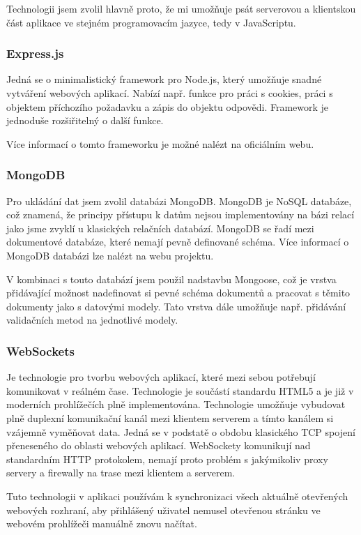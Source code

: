 \documentclass[ing,male,java,dept460]{diploma}						%
\begin{document}
Technologii jsem zvolil hlavně proto, že mi umožňuje psát serverovou a klientskou část aplikace ve stejném programovacím jazyce, tedy v JavaScriptu.

\subsubsection{Express.js}
\label{sec:ExpressJs}
Jedná se o minimalistický framework pro Node.js, který umožňuje snadné vytváření webových aplikací. Nabízí např. funkce pro práci s cookies, práci s objektem příchozího požadavku a zápis do objektu odpovědi. Framework je jednoduše rozšiřitelný o další funkce.

Více informací o tomto frameworku je možné nalézt na oficiálním webu\cite{expressjs}.

\subsubsection{MongoDB}
Pro ukládání dat jsem zvolil databázi MongoDB. MongoDB je NoSQL databáze, což znamená, že principy přístupu k datům nejsou implementovány na bázi relací jako jsme zvyklí u klasických relačních databází. MongoDB se řadí mezi dokumentové databáze, které nemají pevně definované schéma. Více informací o MongoDB databázi lze nalézt na webu projektu\cite{mongodb}.

V kombinaci s touto databází jsem použil nadstavbu Mongoose\cite{mongoose}, což je vrstva přidávající možnost nadefinovat si pevné schéma dokumentů a pracovat s těmito dokumenty jako s datovými modely. Tato vrstva dále umožňuje např. přidávání validačních metod na jednotlivé modely.

\subsubsection{WebSockets}
\label{sec:WebSockets}
Je technologie pro tvorbu webových aplikací, které mezi sebou potřebují komunikovat v reálném čase. Technologie je součástí standardu HTML5 a je již v moderních prohlížečích plně implementována. Technologie umožňuje vybudovat plně duplexní komunikační kanál mezi klientem serverem a tímto kanálem si vzájemně vyměňovat data. Jedná se v podstatě o obdobu klasického TCP spojení přeneseného do oblasti webových aplikací. WebSockety komunikují nad standardním HTTP protokolem, nemají proto problém s jakýmikoliv proxy servery a firewally na trase mezi klientem a serverem.

Tuto technologii v aplikaci používám k synchronizaci všech aktuálně otevřených webových rozhraní, aby přihlášený uživatel nemusel otevřenou stránku ve webovém prohlížeči manuálně znovu načítat.
\end{document}
